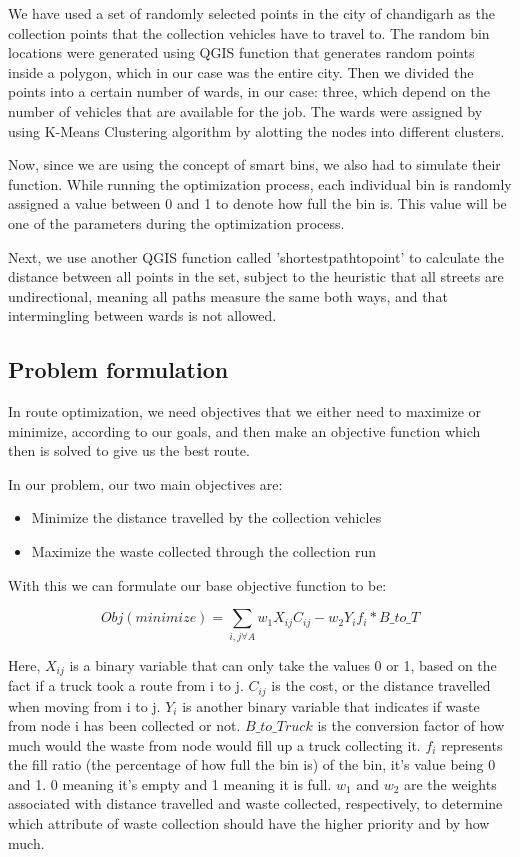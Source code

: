 \documentclass[12pt]{article}
\begin{document}
We have used a set of randomly selected points in the city of chandigarh as the collection points that the collection vehicles have to travel to. The random bin locations were generated using QGIS function that generates random points inside a polygon, which in our case was the entire city. Then we divided the points into a certain number of wards, in our case: three, which depend on the number of vehicles that are available for the job. The wards were assigned by using K-Means Clustering algorithm by alotting the nodes into different clusters.

Now, since we are using the concept of smart bins, we also had to simulate their function. While running the optimization process, each individual bin is randomly assigned a value between 0 and 1 to denote how full the bin is. This value will be one of the parameters during the optimization process.

Next, we use another QGIS function called 'shortestpathtopoint' to calculate the distance between all points in the set, subject to the heuristic that all streets are undirectional, meaning all paths measure the same both ways, and that intermingling between wards is not allowed.

\subsection{Problem formulation}

In route optimization, we need objectives that we either need to maximize or minimize, according to our goals, and then make an objective function which then is solved to give us the best route. 

In our problem, our two main objectives are:
\begin{itemize}
    \item Minimize the distance travelled by the collection vehicles
    \item Maximize the waste collected through the collection run
\end{itemize}

With this we can formulate our base objective function to be:

\begin{equation}\label{eq1}
    Obj(minimize)=\sum_{i,j \forall A} w_1 X_{ij} C_{ij} - w_2 Y_i f_i * B\_to\_T
\end{equation}

Here, $X_{ij}$ is a binary variable that can only take the values 0 or 1, based on the fact if a truck took a route from i to j. $C_{ij}$ is the cost, or the distance travelled when moving from i to j. $Y_{i}$ is another binary variable that indicates if waste from node i has been collected or not. $B\_to\_Truck$ is the conversion factor of how much would the waste from node would fill up a truck collecting it. $f_i$ represents the fill ratio (the percentage of how full the bin is) of the bin, it's value being 0 and 1. 0 meaning it's empty and 1 meaning it is full. $w_1$ and $w_2$ are the weights associated with distance travelled and waste collected, respectively, to determine which attribute of waste collection should have the higher priority and by how much. 
\end{document}
